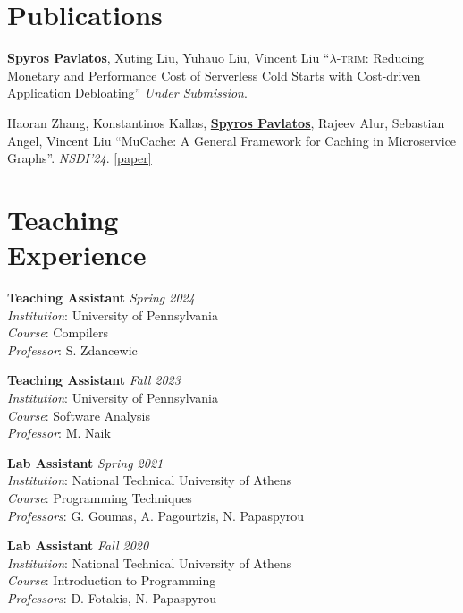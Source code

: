 \documentclass[margin]{res}
\newcommand{\field}[2]{\noindent \textbf{#1} \hfill #2 \\}
\newcommand{\authorref}[1]{\underline {\textbf{#1}}}
\newcommand{\authorme}{\authorref{Spyros Pavlatos}}
\newcommand{\specialurl}[2]{\href {#2} {{{[#1]}}}}
\newcommand{\paper}[1]{\specialurl{paper} {#1}}
\begin{document}
\begin{resume}
\section{Publications}

\begin{enumerate}[nosep, label={[\arabic*]}]

  \item \authorme, Xuting Liu, Yuhauo Liu, Vincent Liu ``$\lambda$-\textsc{trim}: Reducing Monetary and Performance Cost of Serverless Cold Starts with Cost-driven Application Debloating'' \emph{Under Submission}.
 
  \item Haoran Zhang, Konstantinos Kallas,  \authorme, Rajeev Alur, Sebastian Angel, Vincent Liu ``MuCache: A General Framework for Caching in Microservice Graphs''. \emph{NSDI'24}. \paper{https://www.cis.upenn.edu/~sga001/papers/mucache-nsdi24.pdf}
\end{enumerate}

\section{Teaching \\ Experience}

\field{Teaching Assistant}{\emph{Spring 2024}}
\textit{Institution}: University of Pennsylvania \\
\textit{Course}: Compilers \\
\textit{Professor}: S. Zdancewic

\field{Teaching Assistant}{\emph{Fall 2023}}
\textit{Institution}: University of Pennsylvania \\
\textit{Course}: Software Analysis \\
\textit{Professor}: M. Naik

\field{Lab Assistant}{\emph{Spring 2021}}
\textit{Institution}: National Technical University of Athens \\
\textit{Course}: Programming Techniques \\
\textit{Professors}: G. Goumas, A. Pagourtzis, N. Papaspyrou

\field{Lab Assistant}{\emph{Fall 2020}}
\textit{Institution}: National Technical University of Athens \\
\textit{Course}: Introduction to Programming \\
\textit{Professors}: D. Fotakis, N. Papaspyrou


\end{resume}
\end{document}
